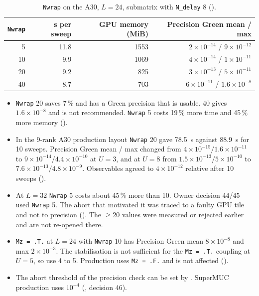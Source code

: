 \begin{table}[h]
\centering
\caption{\texttt{Nwrap} on the A30, $L=24$, submatrix with \texttt{N\_delay} 8 ().}
\small
\begin{tabular}{@{}rrrr@{}}
\toprule
\texttt{Nwrap} & s per sweep & GPU memory (MiB) & Precision Green mean / max \\
\midrule
5 & 11.8 & 1553 & $2\times10^{-14}$ / $9\times10^{-12}$ \\ %
10 & 9.9 & 1069 & $4\times10^{-14}$ / $1\times10^{-11}$ \\
20 & 9.2 & 825 & $3\times10^{-13}$ / $5\times10^{-11}$ \\
40 & 8.7 & 703 & $6\times10^{-11}$ / $1.6\times10^{-8}$ \\
\bottomrule
\end{tabular}
\end{table}

\begin{itemize}
\item \texttt{Nwrap} 20 saves 7\,\% and has a Green precision that is usable. 40 gives $1.6\times10^{-8}$ and is not recommended. \texttt{Nwrap} 5 costs 19\,\% more time and 45\,\% more memory ().
\item In the 9-rank A30 production layout \texttt{Nwrap} 20 gave 78.5~s against 88.9~s for 10 sweeps. Precision Green mean / max changed from $4\times10^{-15}/1.6\times10^{-11}$ to $9\times10^{-14}/4.4\times10^{-10}$ at $U=3$, and at $U=8$ from $1.5\times10^{-13}/5\times10^{-10}$ to $7.6\times10^{-13}/4.8\times10^{-9}$. Observables agreed to $4\times10^{-12}$ relative after 10 sweeps ().
\item At $L=32$ \texttt{Nwrap} 5 costs about 45\,\% more than 10. Owner decision 44/45 used \texttt{Nwrap} 5. The abort that motivated it was traced to a faulty GPU tile and not to precision (). The $\ge20$ values were measured or rejected earlier and are not re-opened there.
\item \texttt{Mz = .T.} at $L=24$ with \texttt{Nwrap} 10 has Precision Green mean $8\times10^{-8}$ and max $2\times10^{-3}$. The stabilisation is not sufficient for the \texttt{Mz = .T.} coupling at $U=5$, so use 4 to 5. Production uses \texttt{Mz = .F.} and is not affected ().
\item The abort threshold of the precision check can be set by . SuperMUC production uses $10^{-4}$ (,  decision 46).
\end{itemize}


